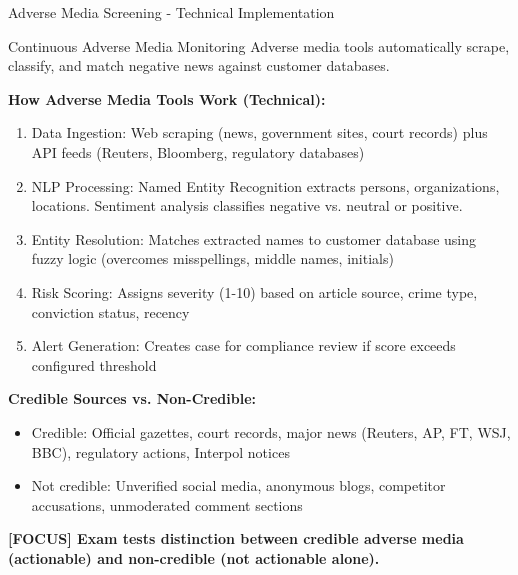 \documentclass[11pt,a4paper]{beamer}
\newcommand{\examfocus}[1]{\textcolor{orange!80!black}{\textbf{[FOCUS] #1}}}
\begin{document}
	\begin{frame}{Adverse Media Screening - Technical Implementation}
		\begin{block}{Continuous Adverse Media Monitoring}
			Adverse media tools automatically scrape, classify, and match negative news against customer databases.
		\end{block}
		
		\textbf{How Adverse Media Tools Work (Technical):}
		\begin{enumerate}
			\item Data Ingestion: Web scraping (news, government sites, court records) plus API feeds (Reuters, Bloomberg, regulatory databases)
			\item NLP Processing: Named Entity Recognition extracts persons, organizations, locations. Sentiment analysis classifies negative vs. neutral or positive.
			\item Entity Resolution: Matches extracted names to customer database using fuzzy logic (overcomes misspellings, middle names, initials)
			\item Risk Scoring: Assigns severity (1-10) based on article source, crime type, conviction status, recency
			\item Alert Generation: Creates case for compliance review if score exceeds configured threshold
		\end{enumerate}
		
		\textbf{Credible Sources vs. Non-Credible:}
		\begin{itemize}
			\item Credible: Official gazettes, court records, major news (Reuters, AP, FT, WSJ, BBC), regulatory actions, Interpol notices
			\item Not credible: Unverified social media, anonymous blogs, competitor accusations, unmoderated comment sections
		\end{itemize}
		
		\examfocus{Exam tests distinction between credible adverse media (actionable) and non-credible (not actionable alone).}
	\end{frame}
	
\end{document}
